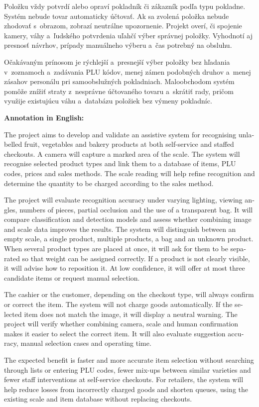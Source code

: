\documentclass[10pt,twocolumn,twoside,slovak,a4paper]{article}
\begin{document}
Položku vždy potvrdí alebo opraví pokladník či zákazník podľa typu pokladne. Systém nebude tovar automaticky účtovať. Ak sa zvolená položka nebude zhodovať s~obrazom, zobrazí neutrálne upozornenie. Projekt overí, či spojenie kamery, váhy a~ľudského potvrdenia uľahčí výber správnej položky. Vyhodnotí aj presnosť návrhov, prípady manuálneho výberu a~čas potrebný na obsluhu.

Očakávaným prínosom je rýchlejší a~presnejší výber položky bez hľadania v~zoznamoch a~zadávania PLU kódov, menej zámen podobných druhov a~menej zásahov personálu pri samoobslužných pokladniach. Maloobchodom systém pomôže znížiť straty z~nesprávne účtovaného tovaru a~skrátiť rady, pričom využije existujúcu váhu a~databázu položiek bez výmeny pokladníc.

\textbf{Annotation in English:}

\begin{otherlanguage}{english}
The project aims to develop and validate an assistive system for recognising unlabelled fruit, vegetables and bakery products at both self-service and staffed checkouts. A camera will capture a marked area of the scale. The system will recognise selected product types and link them to a database of items, PLU codes, prices and sales methods. The scale reading will help refine recognition and determine the quantity to be charged according to the sales method.

The project will evaluate recognition accuracy under varying lighting, viewing angles, numbers of pieces, partial occlusion and the use of a transparent bag. It will compare classification and detection models and assess whether combining image and scale data improves the results. The system will distinguish between an empty scale, a single product, multiple products, a bag and an unknown product. When several product types are placed at once, it will ask for them to be separated so that weight can be assigned correctly. If a product is not clearly visible, it will advise how to reposition it. At low confidence, it will offer at most three candidate items or request manual selection.

The cashier or the customer, depending on the checkout type, will always confirm or correct the item. The system will not charge goods automatically. If the selected item does not match the image, it will display a neutral warning. The project will verify whether combining camera, scale and human confirmation makes it easier to select the correct item. It will also evaluate suggestion accuracy, manual selection cases and operating time.

The expected benefit is faster and more accurate item selection without searching through lists or entering PLU codes, fewer mix-ups between similar varieties and fewer staff interventions at self-service checkouts. For retailers, the system will help reduce losses from incorrectly charged goods and shorten queues, using the existing scale and item database without replacing checkouts.
\end{otherlanguage}
\end{document}
